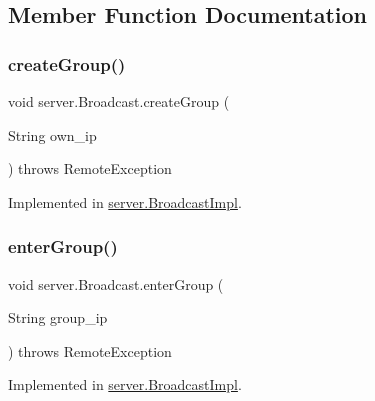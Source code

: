 \subsection{Member Function Documentation}
\mbox{\label{interfaceserver_1_1_broadcast_a1a8d1242a9c00acd3347ae64debe214d}} 
\subsubsection{\texorpdfstring{create\+Group()}{createGroup()}}
{\footnotesize\ttfamily void server.\+Broadcast.\+create\+Group (\begin{DoxyParamCaption}\item[{String}]{own\+\_\+ip }\end{DoxyParamCaption}) throws Remote\+Exception}



Implemented in \hyperlink{classserver_1_1_broadcast_impl_a433529db2e96faf096881d1c38033b45}{server.\+Broadcast\+Impl}.

\mbox{\label{interfaceserver_1_1_broadcast_a6ccaeae4c0aae1a20f1dc0c9de38abf8}} 
\subsubsection{\texorpdfstring{enter\+Group()}{enterGroup()}}
{\footnotesize\ttfamily void server.\+Broadcast.\+enter\+Group (\begin{DoxyParamCaption}\item[{String}]{group\+\_\+ip }\end{DoxyParamCaption}) throws Remote\+Exception}



Implemented in \hyperlink{classserver_1_1_broadcast_impl_a35a07b1f98aaaa51493cd6ff28d6b90d}{server.\+Broadcast\+Impl}.

\mbox{\label{interfaceserver_1_1_broadcast_ada7537c3ca6e9d8361c7194b2a3b6e7d}} 
